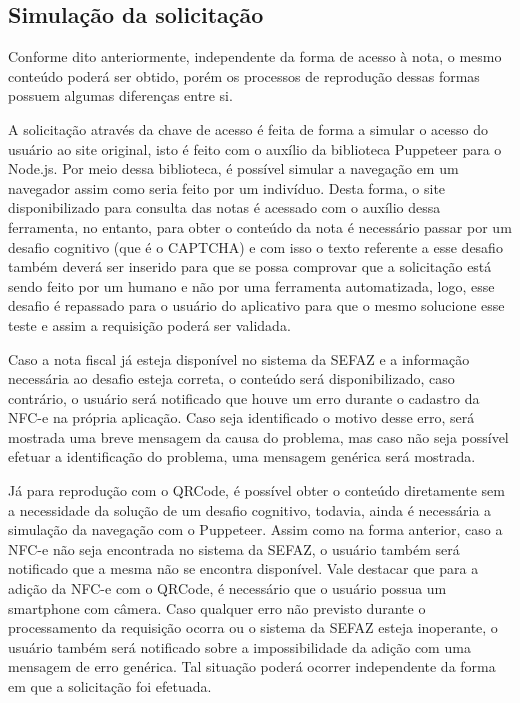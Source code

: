 \subsection{Simulação da solicitação}

Conforme dito anteriormente, independente da forma de acesso à nota, o mesmo conteúdo poderá ser obtido, porém os processos de reprodução dessas formas possuem algumas diferenças entre si.

A solicitação através da chave de acesso é feita de forma a simular o acesso do usuário ao site original, isto é feito com o auxílio da biblioteca Puppeteer para o Node.js. Por meio dessa biblioteca, é possível simular a navegação em um navegador assim como seria feito por um indivíduo. Desta forma, o site disponibilizado para consulta das notas é acessado com o auxílio dessa ferramenta, no entanto, para obter o conteúdo da nota é necessário passar por um desafio cognitivo (que é o CAPTCHA) e com isso o texto referente a esse desafio também deverá ser inserido para que se possa comprovar que a solicitação está sendo feito por um humano e não por uma ferramenta automatizada, logo, esse desafio é repassado para o usuário do aplicativo para que o mesmo solucione esse teste e assim a requisição poderá ser validada.

Caso a nota fiscal já esteja disponível no sistema da SEFAZ e a informação necessária ao desafio esteja correta, o conteúdo será disponibilizado, caso contrário, o usuário será notificado que houve um erro durante o cadastro da NFC-e na própria aplicação. Caso seja identificado o motivo desse erro, será mostrada uma breve mensagem da causa do problema, mas caso não seja possível efetuar a identificação do problema, uma mensagem genérica será mostrada.

Já para reprodução com o QRCode, é possível obter o conteúdo diretamente sem a necessidade da solução de um desafio cognitivo, todavia, ainda é necessária a simulação da navegação com o Puppeteer. Assim como na forma anterior, caso a NFC-e não seja encontrada no sistema da SEFAZ, o usuário também será notificado que a mesma não se encontra disponível. Vale destacar que para a adição da NFC-e com o QRCode, é necessário que o usuário possua um smartphone com câmera. Caso qualquer erro não previsto durante o processamento da requisição ocorra ou o sistema da SEFAZ esteja inoperante, o usuário também será notificado sobre a impossibilidade da adição com uma mensagem de erro genérica. Tal situação poderá ocorrer independente da forma em que a solicitação foi efetuada.

